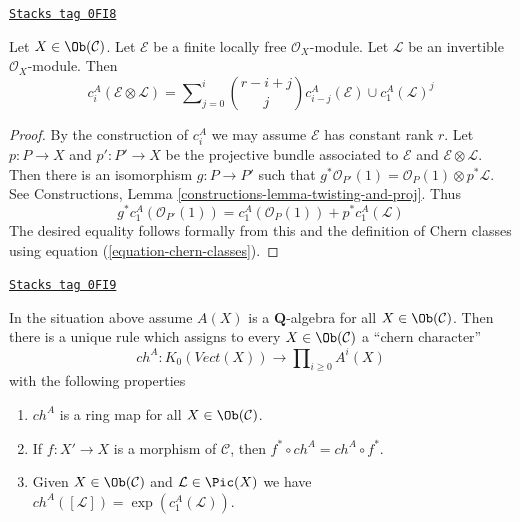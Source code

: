 \begin{lemma}
\label{weil-lemma-chern-classes-E-tensor-L}
\href{https://stacks.math.columbia.edu/tag/0FI8}{\texttt{Stacks tag 0FI8}}

Let $X \in \Ob(\mathcal{C})$. Let $\mathcal{E}$ be a finite locally free
$\mathcal{O}_X$-module. Let $\mathcal{L}$ be an invertible
$\mathcal{O}_X$-module. Then
$$
c^A_i({\mathcal E} \otimes {\mathcal L})
=
\sum\nolimits_{j = 0}^i
\binom{r - i + j}{j} c^A_{i - j}({\mathcal E}) \cup c^A_1({\mathcal L})^j
$$
\end{lemma}

\begin{proof}
By the construction of $c^A_i$ we may assume $\mathcal{E}$ has
constant rank $r$. Let $p : P \to X$ and $p' : P' \to X$ be the
projective bundle associated to $\mathcal{E}$ and
$\mathcal{E} \otimes \mathcal{L}$.
Then there is an isomorphism $g : P \to P'$ such that
$g^*\mathcal{O}_{P'}(1) = \mathcal{O}_P(1) \otimes p^*\mathcal{L}$.
See Constructions, Lemma \ref{constructions-lemma-twisting-and-proj}.
Thus
$$
g^*c_1^A(\mathcal{O}_{P'}(1)) =
c_1^A(\mathcal{O}_P(1)) + p^*c_1^A(\mathcal{L})
$$
The desired equality follows formally from this and the definition
of Chern classes using equation (\ref{equation-chern-classes}).
\end{proof}

\begin{proposition}
\label{weil-proposition-chern-character}
\href{https://stacks.math.columbia.edu/tag/0FI9}{\texttt{Stacks tag 0FI9}}

In the situation above assume $A(X)$ is a $\mathbf{Q}$-algebra for all
$X \in \Ob(\mathcal{C})$. Then there is a unique rule which assigns to
every $X \in \Ob(\mathcal{C})$ a ``chern character''
$$
ch^A : K_0(\textit{Vect}(X)) \longrightarrow
\prod\nolimits_{i \geq 0} A^i(X)
$$
with the following properties
\begin{enumerate}
\item $ch^A$ is a ring map for all $X \in \Ob(\mathcal{C})$.
\item If $f : X' \to X$ is a morphism of $\mathcal{C}$, then
$f^* \circ ch^A =  ch^A \circ f^*$.
\item Given $X \in \Ob(\mathcal{C})$ and $\mathcal{L} \in \Pic(X)$
we have $ch^A([\mathcal{L}]) = \exp(c_1^A(\mathcal{L}))$.
\end{enumerate}
\end{proposition}

